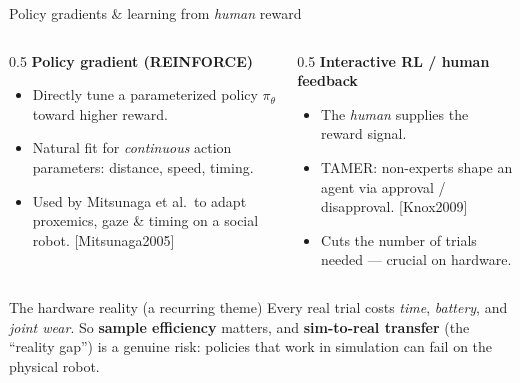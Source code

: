 \documentclass[aspectratio=169,10pt]{beamer}
\newcommand{\refnum}[1]{{\footnotesize\color{giuaccent}[#1]}}
\begin{document}
\begin{frame}{Policy gradients \& learning from \emph{human} reward}
  \begin{columns}[T]
    \begin{column}{0.5\textwidth}
      \textbf{Policy gradient (REINFORCE)}
      \begin{itemize}\footnotesize
        \item Directly tune a parameterized policy $\pi_\theta$ toward higher reward.
        \item Natural fit for \emph{continuous} action parameters: distance, speed, timing.
        \item Used by Mitsunaga et al.\ to adapt proxemics, gaze \& timing on a social robot. \refnum{Mitsunaga2005}
      \end{itemize}
    \end{column}
    \begin{column}{0.5\textwidth}
      \textbf{Interactive RL / human feedback}
      \begin{itemize}\footnotesize
        \item The \emph{human} supplies the reward signal.
        \item \alert{TAMER}: non-experts shape an agent via approval / disapproval. \refnum{Knox2009}
        \item Cuts the number of trials needed --- crucial on hardware.
      \end{itemize}
    \end{column}
  \end{columns}
  \vspace{0.6em}
  \begin{alertblock}{The hardware reality (a recurring theme)}
    Every real trial costs \emph{time}, \emph{battery}, and \emph{joint wear}. So \textbf{sample efficiency} matters, and \textbf{sim-to-real transfer} (the ``reality gap'') is a genuine risk: policies that work in simulation can fail on the physical robot.
  \end{alertblock}
\end{frame}
\end{document}
